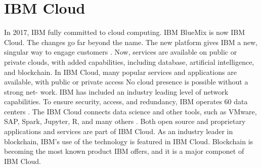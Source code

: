 \section{IBM Cloud}


In 2017, IBM fully committed to cloud computing. IBM BlueMix
is now IBM Cloud. The changes go far beyond the name. The new 
platform gives IBM a new, singular way to engage customers 
\cite{hid-sp18-525-cloud}. Now, services are available on public or 
private clouds, with added capabilities, including database, 
artificial intelligence, and blockchain\cite{hid-sp18-525-cloud}.
In IBM Cloud, many popular services and applications are 
available, with public or private access No cloud presence 
is possible without a strong net- work. IBM has included an 
industry leading level of network capabilities. To ensure 
security, access, and redundancy, IBM operates 60 data centers 
\cite{hid-sp18-525-cloud}.
The IBM Cloud connects data science and other tools, such as 
VMware, SAP, Spark, Jupyter, R, and many others 
\cite{hid-sp18-525-cloud}. Both open source and proprietary 
applications and services are part of IBM Cloud.
As an industry leader in blockchain, IBM’s use of the 
technology is featured in IBM Cloud. Blockchain is becoming 
the most known product IBM offers, and it is a major componet
of IBM Cloud\cite{hid-sp18-525-cloud}.
